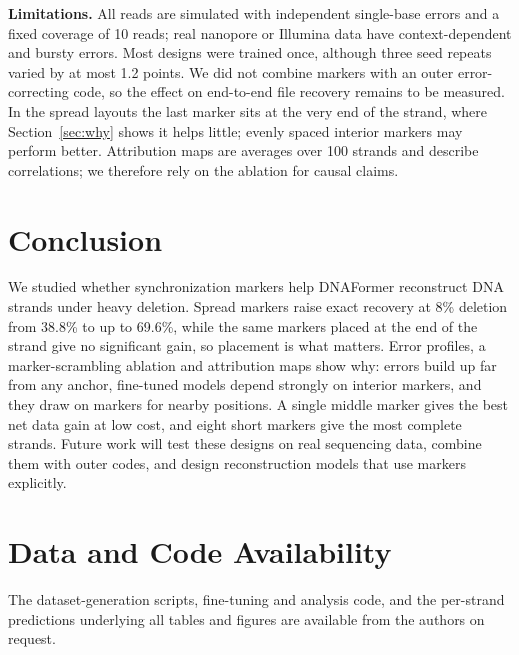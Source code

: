 \textbf{Limitations.} All reads are simulated with independent single-base errors and a fixed coverage of 10 reads;
real nanopore or Illumina data have context-dependent and bursty errors. Most designs were trained once, although three
seed repeats varied by at most 1.2 points. We did not combine markers with an outer error-correcting code, so the effect
on end-to-end file recovery remains to be measured. In the spread layouts the last marker sits at the very end of the
strand, where Section~\ref{sec:why} shows it helps little; evenly spaced interior markers may perform better. Attribution maps are
averages over 100 strands and describe correlations; we therefore rely on the ablation for causal claims.

\section{Conclusion}

We studied whether synchronization markers help DNAFormer reconstruct DNA strands under heavy deletion. Spread markers
raise exact recovery at 8\% deletion from 38.8\% to up to 69.6\%, while the same markers placed at the end of the strand
give no significant gain, so placement is what matters. Error profiles, a marker-scrambling ablation and attribution maps
show why: errors build up far from any anchor, fine-tuned models depend strongly on interior markers, and they draw on
markers for nearby positions. A single middle marker gives the best net data gain at low cost, and eight short markers
give the most complete strands. Future work will test these designs on real sequencing data, combine them with outer
codes, and design reconstruction models that use markers explicitly.

\section*{Data and Code Availability}
The dataset-generation scripts, fine-tuning and analysis code, and the per-strand predictions underlying all tables
and figures are available from the authors on request.
